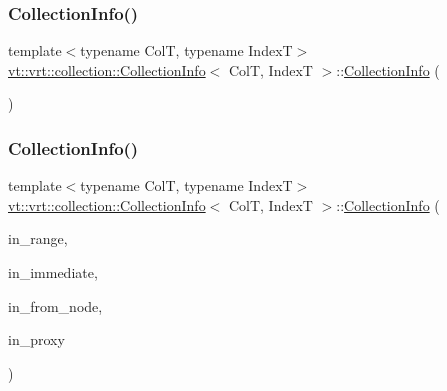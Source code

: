 \subsubsection{\texorpdfstring{Collection\+Info()}{CollectionInfo()}\hspace{0.1cm}{\footnotesize\ttfamily [2/3]}}
{\footnotesize\ttfamily template$<$typename ColT, typename IndexT$>$ \\
\hyperlink{structvt_1_1vrt_1_1collection_1_1_collection_info}{vt\+::vrt\+::collection\+::\+Collection\+Info}$<$ ColT, IndexT $>$\+::\hyperlink{structvt_1_1vrt_1_1collection_1_1_collection_info}{Collection\+Info} (\begin{DoxyParamCaption}\item[{\hyperlink{structvt_1_1vrt_1_1collection_1_1_collection_info}{Collection\+Info}$<$ ColT, IndexT $>$ const \&}]{ }\end{DoxyParamCaption})\hspace{0.3cm}{\ttfamily [default]}}

\mbox{\label{structvt_1_1vrt_1_1collection_1_1_collection_info_a8f1f1ea8fffa846772e35288afad5767}} 
\subsubsection{\texorpdfstring{Collection\+Info()}{CollectionInfo()}\hspace{0.1cm}{\footnotesize\ttfamily [3/3]}}
{\footnotesize\ttfamily template$<$typename ColT, typename IndexT$>$ \\
\hyperlink{structvt_1_1vrt_1_1collection_1_1_collection_info}{vt\+::vrt\+::collection\+::\+Collection\+Info}$<$ ColT, IndexT $>$\+::\hyperlink{structvt_1_1vrt_1_1collection_1_1_collection_info}{Collection\+Info} (\begin{DoxyParamCaption}\item[{IndexT const \&}]{in\+\_\+range,  }\item[{bool const}]{in\+\_\+immediate,  }\item[{\hyperlink{namespacevt_a866da9d0efc19c0a1ce79e9e492f47e2}{Node\+Type} const \&}]{in\+\_\+from\+\_\+node,  }\item[{\hyperlink{namespacevt_a1b417dd5d684f045bb58a0ede70045ac}{Virtual\+Proxy\+Type}}]{in\+\_\+proxy }\end{DoxyParamCaption})\hspace{0.3cm}{\ttfamily [inline]}}



